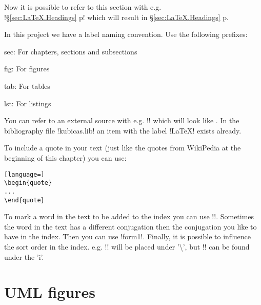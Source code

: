 \noindent
Now it is possible to refer to this section with e.g.\\
!\S\ref{sec:LaTeX.Headings} p\pageref{sec:LaTeX.Headings}! which will result in
\S\ref{sec:LaTeX.Headings} p\pageref{sec:LaTeX.Headings}.

In this project we have a label naming convention. Use the following prefixes:
\begin{description*}
\item[sec:] For chapters, sections and subsections
\item[fig:] For figures
\item[tab:] For tables
\item[lst:] For listings
\end{description*}


\noindent
You can refer to an external source with e.g. !\cite{LaTeX}! which will look
like \cite{LaTeX}. In the bibliography file !kubicas.lib! an item with the
label !LaTeX! exists already.

To include a quote in your text (just like the quotes from WikiPedia at the
beginning of this chapter) you can use:

\begin{lstlisting}[language=]
\begin{quote}
...
\end{quote}
\end{lstlisting}


\noindent
To mark a word in the text to be added to the index you can use !!.
Sometimes the word in the text has a different conjugation then the conjugation
you like to have in the index. Then you can use !form1!.
Finally, it is possible to influence the sort order in the index. e.g.
!! will be placed under '\textbackslash', but
!! can be found under the 'i'.

\section{UML figures}

